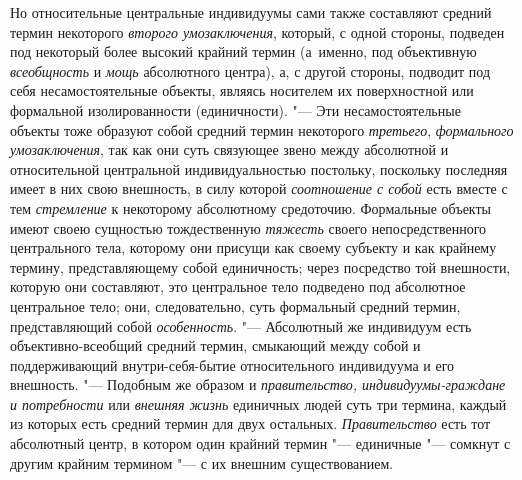 Но относительные центральные индивидуумы сами также составляют
средний термин некоторого {\em второго
умозаключения}, который, с одной стороны, подведен под
некоторый более высокий крайний термин (а~именно, под объективную
{\em всеобщность} и {\em мощь} абсолютного
центра), а, с другой стороны, подводит под себя несамостоятельные объекты,
являясь носителем их поверхностной или формальной изолированности
(единичности).
"--- Эти несамостоятельные объекты тоже образуют
собой средний термин некоторого
{\em третьего},
{\em формального умозаключения},
так как они суть связующее звено между абсолютной и
относительной центральной индивидуальностью постольку, поскольку последняя
имеет в них свою внешность, в силу которой
{\em соотношение с собой}
есть вместе с тем
{\em стремление} к
некоторому абсолютному средоточию. Формальные объекты имеют своею сущностью
тождественную {\em тяжесть}
своего непосредственного центрального тела, которому они
присущи как своему субъекту и как крайнему термину, представляющему собой
единичность; через посредство той внешности, которую они составляют, это
центральное тело подведено под абсолютное центральное тело; они,
следовательно, суть формальный средний термин, представляющий собой
{\em особенность}.
"--- Абсолютный же индивидуум есть объективно-всеобщий средний
термин, смыкающий между собой и поддерживающий внутри-себя-бытие
относительного индивидуума и его
внешность.
"--- \label{bkm:bm52b}Подобным же образом и
{\em правительство, индивидуумы-граждане и потребности} или {\em внешняя жизнь}
единичных людей суть три термина, каждый из которых есть
средний термин для двух остальных.
{\em Правительство} есть
тот абсолютный центр, в котором один крайний термин
"--- единичные "--- сомкнут с другим крайним
термином "--- с их внешним
существованием.
